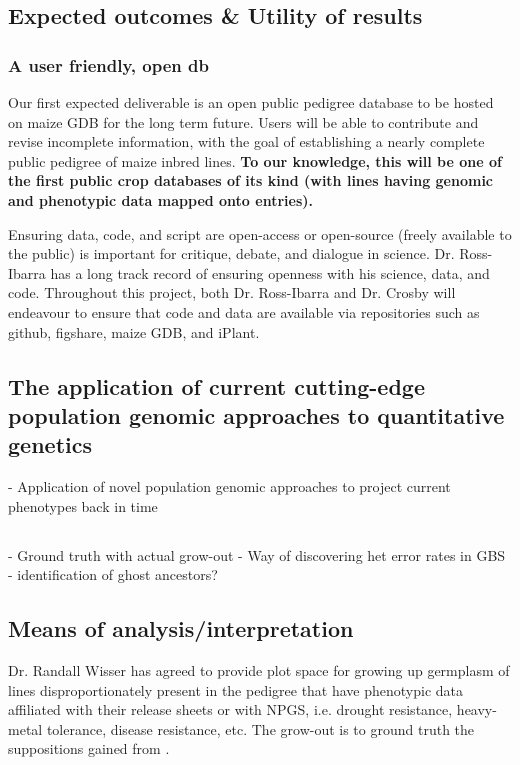 \documentclass[12pt]{article}
\begin{document}
\subsection*{Expected outcomes \& Utility of results}
\subsubsection*{A user friendly, open db}
Our first expected deliverable is an open public pedigree database to be hosted on maize GDB for the long term future. Users will be able to contribute and revise incomplete information, with the goal of establishing a nearly complete public pedigree of maize inbred lines. \textbf{To our knowledge, this will be one of the first public crop databases of its kind (with lines having genomic and phenotypic data mapped onto entries).}
\par Ensuring data, code, and script are open-access or open-source (freely available to the public) is important for critique, debate, and dialogue in science. Dr. Ross-Ibarra has a long track record of ensuring openness with his science, data, and code. Throughout this project, both Dr. Ross-Ibarra and Dr. Crosby will endeavour to ensure that code and data are available via repositories such as github, figshare, maize GDB, and iPlant.

\subsection*{The application of current cutting-edge population genomic approaches to quantitative genetics}

- Application of novel population genomic approaches to project current phenotypes back in time

\subsection*{}
- Ground truth with actual grow-out
- Way of discovering het error rates in GBS
- identification of ghost ancestors?

\subsection*{Means of analysis/interpretation}
Dr. Randall Wisser has agreed to provide plot space for growing up germplasm of lines disproportionately present in the pedigree that have phenotypic data affiliated with their release sheets or with NPGS, i.e. drought resistance, heavy-metal tolerance, disease resistance, etc. The grow-out is to ground truth the suppositions gained from \citep{Berg:2014bs}.
\end{document}

